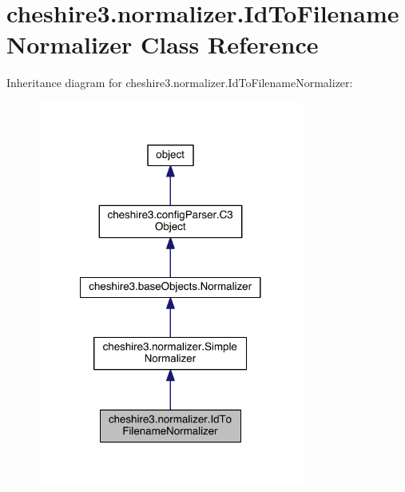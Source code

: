 \hypertarget{classcheshire3_1_1normalizer_1_1_id_to_filename_normalizer}{\section{cheshire3.\-normalizer.\-Id\-To\-Filename\-Normalizer Class Reference}
\label{classcheshire3_1_1normalizer_1_1_id_to_filename_normalizer}
}


Inheritance diagram for cheshire3.\-normalizer.\-Id\-To\-Filename\-Normalizer\-:
\nopagebreak
\begin{figure}[H]
\begin{center}
\leavevmode
\includegraphics[width=248pt]{classcheshire3_1_1normalizer_1_1_id_to_filename_normalizer__inherit__graph}
\end{center}
\end{figure}


